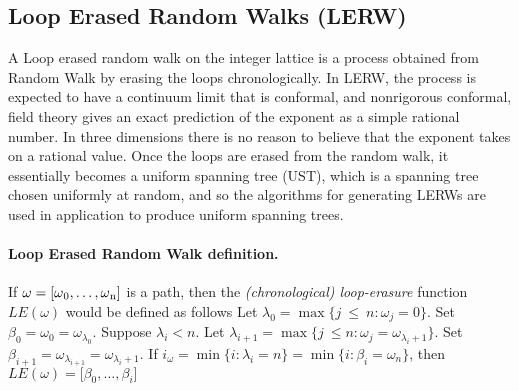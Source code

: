 \documentclass{article}
\begin{document}
\subsection{Loop Erased Random Walks (LERW)}
	A Loop erased random walk on the integer lattice is a process obtained from Random Walk by erasing the loops chronologically. In LERW, the process is expected to have a continuum limit that is conformal, and nonrigorous conformal, field theory gives an exact prediction of the exponent as a simple rational number. In three dimensions there is no reason to believe that the exponent takes on a rational value. Once the loops are erased from the random walk, it essentially becomes a uniform spanning tree (UST), which is a spanning tree chosen uniformly at random, and so the algorithms for generating LERWs are used in application to produce  uniform spanning trees.

\paragraph{Loop Erased Random Walk definition.} \label{alg:LE} If $\omega = [\omega\textsubscript{0}, \ldots, \omega\textsubscript{n}]$ is a path, then the \emph{(chronological) loop-erasure} function $LE(\omega)$ would be defined as follows\cite{klafter2011} \newline
	Let $\lambda_{0} = \max\{j\ \le \ n: \omega_{j}=0\}$. Set $\beta_{0}=\omega_{0}=\omega_{\lambda_{0}}$.
	\newline
	Suppose $\lambda_{i} < n$. Let $\lambda_{i+1} = \max\{j\ \le n: \omega_{j}=\omega_{\lambda_{i}+1}\}$. Set $\beta_{i+1}=\omega_{\lambda_{i+1}}=\omega_{\lambda_{i}+1}$.
	\newline
	If $i_{\omega} = \min \{i : \lambda_{i} = n\} = \min\{i : \beta_{i} = \omega_{n}\}$, then $LE\left(\omega\right) = \lbrack \beta_{0},\ldots,\beta_{i}\rbrack$
\iffalse		
	\subsubsection{Characteristic function}
		The Characteristic function is used to provide a mathematical description of random walks. This is because the characteristic function of a random variable defines its probability distribution in its entirety.
		\subsubsection{Central Limit Theorem (CLT)} 
\fi
\newpage
\end{document}
